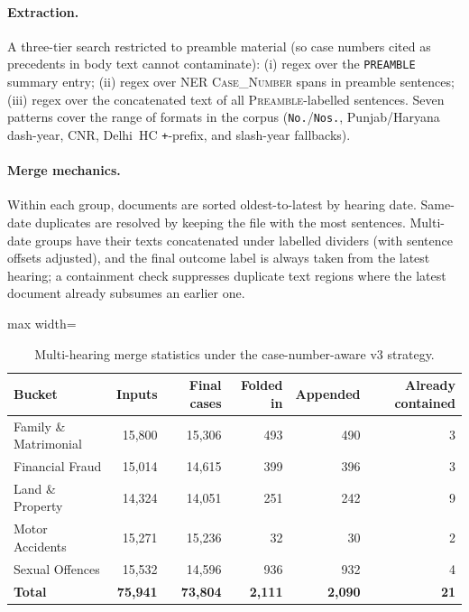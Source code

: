 \paragraph{Extraction.} A three-tier search restricted to preamble material (so case numbers cited as precedents in body text cannot contaminate): (i) regex over the \texttt{PREAMBLE} summary entry; (ii) regex over NER \textsc{Case\_Number} spans in preamble sentences; (iii) regex over the concatenated text of all \textsc{Preamble}-labelled sentences. Seven patterns cover the range of formats in the corpus (\texttt{No.}/\texttt{Nos.}, Punjab/Haryana dash-year, CNR, Delhi~HC \texttt{+}-prefix, and slash-year fallbacks).

\paragraph{Merge mechanics.} Within each group, documents are sorted oldest-to-latest by hearing date. Same-date duplicates are resolved by keeping the file with the most sentences. Multi-date groups have their texts concatenated under labelled dividers (with sentence offsets adjusted), and the final outcome label is always taken from the latest hearing; a containment check suppresses duplicate text regions where the latest document already subsumes an earlier one.

\begin{table}[H]
  \centering
  \small
  \begin{adjustbox}{max width=\textwidth}
  \begin{tabular}{lrrrrr}
    \toprule
    Bucket & Inputs & Final cases & Folded in & Appended & Already contained \\
    \midrule
    Family \& Matrimonial & 15{,}800 & 15{,}306 & 493 & 490 & 3 \\
    Financial Fraud & 15{,}014 & 14{,}615 & 399 & 396 & 3 \\
    Land \& Property & 14{,}324 & 14{,}051 & 251 & 242 & 9 \\
    Motor Accidents & 15{,}271 & 15{,}236 & 32 & 30 & 2 \\
    Sexual Offences & 15{,}532 & 14{,}596 & 936 & 932 & 4 \\
    \midrule
    \textbf{Total} & \textbf{75{,}941} & \textbf{73{,}804} & \textbf{2{,}111}
      & \textbf{2{,}090} & \textbf{21} \\
    \bottomrule
  \end{tabular}
  \end{adjustbox}
  \caption{Multi-hearing merge statistics under the case-number-aware v3 strategy.}
  \label{tab:merge_stats}
\end{table}

